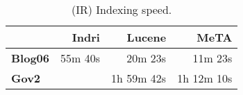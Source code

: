 \begin{table}[t]
\centering
{\small
\begin{tabular}{|l|r|r|r|}
        \hline & \textbf{Indri} & \textbf{Lucene} & \textbf{MeTA} \\
        \hline
        \textbf{Blog06} & 55m 40s & 20m 23s & 11m 23s \\
        \textbf{Gov2}   & & 1h 59m 42s & 1h 12m 10s \\
        \hline
\end{tabular}
\caption{(IR) Indexing speed.}
\label{table:ir-indexing}
}
\end{table}
